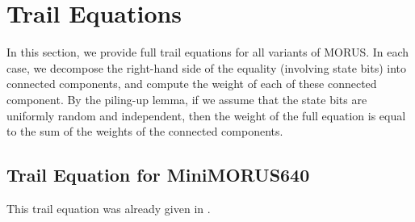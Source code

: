 \documentclass{llncs}
\newcommand{\cipher}[1]{\textsf{#1}}
\begin{document}
\appendix

\section{Trail Equations}
\label{sec:traileq}

In this section, we provide full trail equations for all variants of \cipher{MORUS}. In each case, we decompose the right-hand side of the equality (involving state bits) into connected components, and compute the weight of each of these connected component. By the piling-up lemma, if we assume that the state bits are uniformly random and independent, then the weight of the full equation is equal to the sum of the weights of the connected components.

\subsection{Trail Equation for \cipher{MiniMORUS640}}

This trail equation was already given in .
\end{document}

